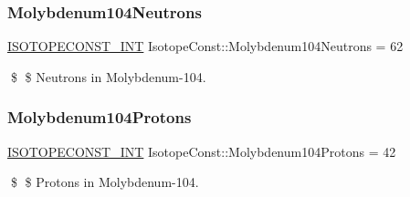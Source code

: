 \subsubsection{\texorpdfstring{Molybdenum104\+Neutrons}{Molybdenum104Neutrons}}
{\footnotesize\ttfamily \mbox{\hyperlink{group___isotope_const-_macros_ga5f18360b3e99483a35c32d789e62621c}{I\+S\+O\+T\+O\+P\+E\+C\+O\+N\+S\+T\+\_\+\+I\+NT}} Isotope\+Const\+::\+Molybdenum104\+Neutrons = 62}

\$ \$ Neutrons in Molybdenum-\/104. \mbox{\label{group___isotope_const-_molybdenum-_mo104_ga39ab7bd84de192ffdb72c9d1c623fb77}} 
\subsubsection{\texorpdfstring{Molybdenum104\+Protons}{Molybdenum104Protons}}
{\footnotesize\ttfamily \mbox{\hyperlink{group___isotope_const-_macros_ga5f18360b3e99483a35c32d789e62621c}{I\+S\+O\+T\+O\+P\+E\+C\+O\+N\+S\+T\+\_\+\+I\+NT}} Isotope\+Const\+::\+Molybdenum104\+Protons = 42}

\$ \$ Protons in Molybdenum-\/104. 